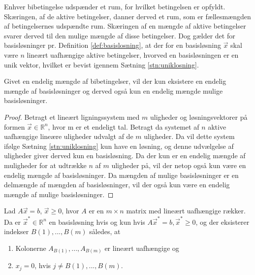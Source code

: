 Enhver bibetingelse udspænder et rum, for hvilket betingelsen er opfyldt. Skæringen, af de aktive betingelser, danner derved et rum, som er fællesmængden af betingelsernes udspændte rum. Skæringen af en mængde af aktive betingelser svarer derved til den mulige mængde af disse betingelser. Dog gælder det for basisløsninger pr. Definition \ref{def:basislosning}, at der for en basisløsning $\vec{x}$ skal være $n$ lineært uafhængige aktive betingelser, hvorved en basisløsningen er en unik vektor, hvilket er bevist igennem Sætning \ref{stn:uniklosning}. %

\begin{kor}
Givet en endelig mængde af bibetingelser, vil der kun eksistere en endelig mængde af basisløsninger og derved også kun en endelig mængde mulige basisløsninger.
\label{kor:endeligbasis}
\end{kor}

\begin{proof}
Betragt et lineært ligningssystem med $m$ uligheder og løsningsvektorer på formen $\vec{x} \in \mathds{R}^n$, hvor m er et endeligt tal.
	Betragt da systemet af $n$ aktive uafhængige lineære uligheder udvalgt af de $m$ uligheder. Da vil dette system ifølge Sætning \ref{stn:uniklosning} kun have en løsning, og denne udvælgelse af uligheder giver derved kun en basisløsning. Da der kun er en endelig mængde af muligheder for at udtrække $n$ af $m$ uligheder på, vil der netop også kun være en endelig mængde af basisløsninger. Da mængden af mulige basisløsninger er en delmængde af mængden af basisløsninger, vil der også kun være en endelig mængde af mulige basisløsninger.
\end{proof}

\begin{stn}
Lad $A\vec{x}=b$, $\vec{x}\geq 0$, hvor $A$ er en $m\times n$ matrix med lineært uafhængige rækker. Da er $\vec{x}^*\in \mathds{R}^n$ en basisløsning hvis og kun hvis $A\vec{x}^*=b, \vec{x}^* \geq 0$, og der eksisterer indekser $B(1), ..., B(m)$ således, at
\begin{enumerate}[label=(\alph*)]
\item Kolonerne $A_{B(1)}, ..., A_{B(m)}$ er lineært uafhængige og
\item $x_j = 0$, hvis $j \neq B(1),...,B(m)$.
\end{enumerate}
\label{stn:kravtilbasis}
\end{stn}

